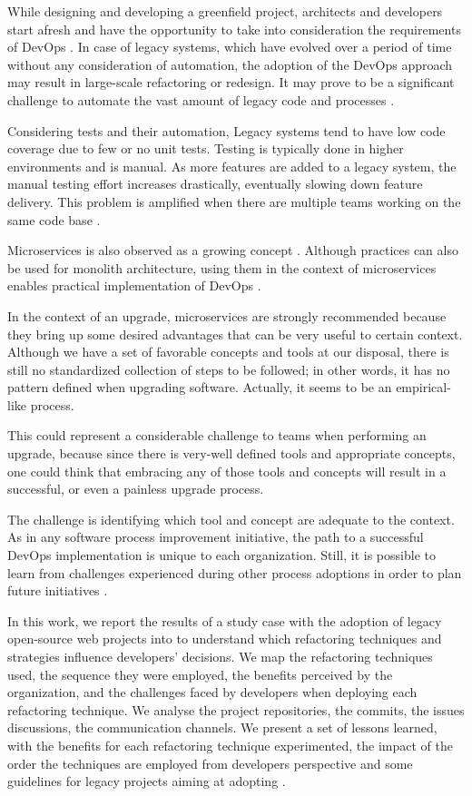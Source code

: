  While designing and developing a greenfield project, architects and developers
 start afresh and have the opportunity to take into consideration the
 requirements of DevOps  \cite{infosys2018}.  In case of legacy systems, which
 have evolved over a period of time without any consideration of automation, the
 adoption of the DevOps approach may result in large-scale refactoring or
 redesign. It may prove to be a significant challenge to automate the vast
 amount of legacy code and processes \cite{infosys2018}.
 
 Considering tests and their automation, Legacy systems tend to have low code
 coverage due to few or no unit tests. Testing is typically done in higher
 environments and is manual. As more features are added to a legacy system, the
 manual testing effort increases drastically, eventually slowing down feature
 delivery. This problem is amplified when there are multiple teams working on
 the same code base \cite{infosys2018}.

Microservices is also observed as a growing concept \cite{jamshid2016}. Although
\devops practices can also be used for monolith architecture, using them in the
context of microservices enables practical implementation of DevOps
\cite{jamshid2016}.

In the context of an upgrade, microservices are strongly recommended because they
bring up some desired advantages that can be very useful to certain context.
Although we have a set of favorable concepts and tools at our disposal, there is
still no standardized collection of steps to be followed; in other words, it has
no pattern defined when upgrading software. Actually, it seems to be an
empirical-like process.

This could represent a considerable challenge to teams when performing an
upgrade, because since there is very-well defined tools and appropriate
concepts, one could think that embracing any of those tools and concepts will
result in a successful, or even a painless upgrade process.

The challenge is identifying which tool and concept are adequate to the context.
As in any software process improvement initiative, the path to a successful
DevOps implementation is unique to each organization. Still, it is possible to
learn from challenges experienced during other process adoptions in order to
plan future initiatives \cite{porres2015}.

In this work,  we report the results of a study case with the adoption of
\numberofprojects legacy open-source web projects into \devops to understand
which refactoring techniques and strategies influence developers' decisions. We
map the refactoring techniques used, the sequence they were employed, the
benefits perceived by the organization,  and the challenges faced by developers
when deploying each refactoring technique. We analyse the project repositories,
the commits, the issues discussions, the communication channels. We present a
set of lessons learned, with the \devops benefits for each refactoring technique
experimented, the impact of the order the techniques are employed from
developers perspective and some guidelines for legacy projects aiming at
adopting \devops. 
